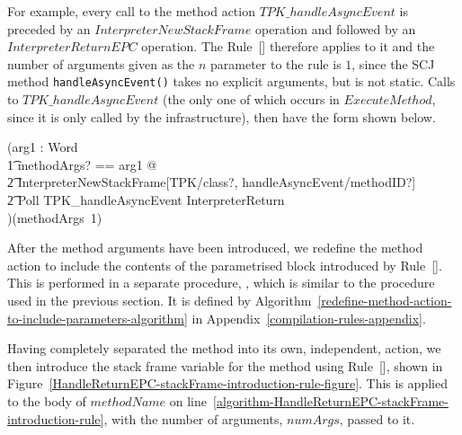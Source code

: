 For example, every call to the method action $TPK\_handleAsyncEvent$
is preceded by an $InterpreterNewStackFrame$ operation and followed by
an $InterpreterReturnEPC$ operation.
The Rule~[] therefore applies to it
and the number of arguments given as the $n$ parameter to the rule is
$1$, since the SCJ method \texttt{handleAsyncEvent()} takes no
explicit arguments, but is not static.
Calls to $TPK\_handleAsyncEvent$ (the only one of which occurs in
$ExecuteMethod$, since it is only called by the infrastructure), then
have the form shown below.
\begin{circus}
  (\circval arg1 : Word \circspot \\
      \t1 \lschexpract \exists methodArgs? == \langle arg1 \rangle @ \\
      \t2 InterpreterNewStackFrame[TPK/class?, handleAsyncEvent/methodID?] \rschexpract \circseq \\
      \t2 Poll \circseq TPK\_handleAsyncEvent \circseq \lschexpract InterpreterReturn \rschexpract \\
      )(methodArgs~1)
\end{circus}

After the method arguments have been introduced, we redefine the
method action to include the contents of the parametrised block
introduced by Rule~[].
This is performed in a separate procedure,
, which is similar to
the  procedure used
in the previous section.
It is defined by
Algorithm~\ref{redefine-method-action-to-include-parameters-algorithm}
in Appendix~\ref{compilation-rules-appendix}.

Having completely separated the method into its own, independent,
action, we then introduce the stack frame variable for the method
using Rule~[],
shown in
Figure~\ref{HandleReturnEPC-stackFrame-introduction-rule-figure}.
This is applied to the body of $methodName$ on
line~\ref{algorithm-HandleReturnEPC-stackFrame-introduction-rule},
with the number of arguments, $numArgs$, passed to it.

